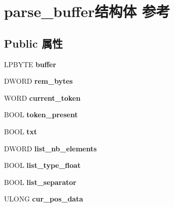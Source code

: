 \hypertarget{structparse__buffer}{}\section{parse\+\_\+buffer结构体 参考}
\label{structparse__buffer}
\subsection*{Public 属性}
\begin{DoxyCompactItemize}
\item 
\mbox{\label{structparse__buffer_a7bb73ba55f1dcdff2849fb122d4b1fb9}} 
L\+P\+B\+Y\+TE {\bfseries buffer}
\item 
\mbox{\label{structparse__buffer_a81236289236b878bc7f3d919fec58657}} 
D\+W\+O\+RD {\bfseries rem\+\_\+bytes}
\item 
\mbox{\label{structparse__buffer_ae1affb5b0cb808b25cc9cb89c50cd44c}} 
W\+O\+RD {\bfseries current\+\_\+token}
\item 
\mbox{\label{structparse__buffer_a65fbe642bd4a7ee1e53324a17cd7d3be}} 
B\+O\+OL {\bfseries token\+\_\+present}
\item 
\mbox{\label{structparse__buffer_ac482bbd9de99f5f8fa42ab5527cc1f7f}} 
B\+O\+OL {\bfseries txt}
\item 
\mbox{\label{structparse__buffer_ab54dc07ad4f2b49dfde320a81e075e1a}} 
D\+W\+O\+RD {\bfseries list\+\_\+nb\+\_\+elements}
\item 
\mbox{\label{structparse__buffer_a7e4286cbffde0a1b6c54fc8f246a57ff}} 
B\+O\+OL {\bfseries list\+\_\+type\+\_\+float}
\item 
\mbox{\label{structparse__buffer_ac0125b80b924aa15b98f5d5f93062d0c}} 
B\+O\+OL {\bfseries list\+\_\+separator}
\item 
\mbox{\label{structparse__buffer_a240f6f746571f2fd33d2d7d356f890aa}} 
U\+L\+O\+NG {\bfseries cur\+\_\+pos\+\_\+data}
\item 

\end{DoxyCompactItemize}
